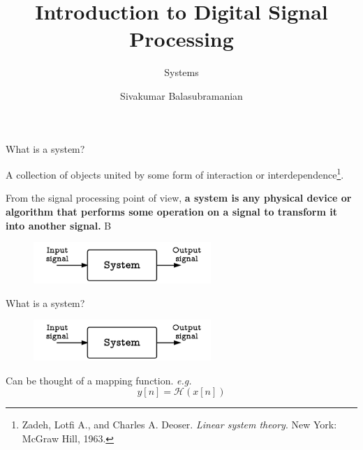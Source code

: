 \documentclass[aspectratio=169]{beamer}
\title{Introduction to Digital Signal Processing}
\subtitle{Systems}
\author{Sivakumar Balasubramanian}
\institute[Christian Medical College] %
{
  \inst{}%
  Department of Bioengineering\\
  Christian Medical College, Bagayam\\
  Vellore 632002
}
\date{}
\begin{document}
\begin{frame}
  \titlepage
\end{frame}

\begin{frame}{What is a system?}

A collection of objects united by some form of interaction or interdependence\footnote{Zadeh, Lotfi A., and Charles A. Deoser. \textit{Linear system theory}. New York: McGraw Hill, 1963.}.

\vspace{4mm}

From the signal processing point of view, \textbf{a system is any physical device or algorithm that performs some operation on a signal to transform it into another signal.}
B
\begin{figure}
\includegraphics[width=0.6\textwidth]{img/system.png}
\end{figure}

\end{frame}

\begin{frame}{What is a system?}

\begin{figure}
\includegraphics[width=0.6\textwidth]{img/system.png}
\end{figure}

Can be thought of a mapping function. \textit{e.g.}
\[ y[n] = \mathcal{H}\left(x[n]\right) \]

\end{frame}
\end{document}
